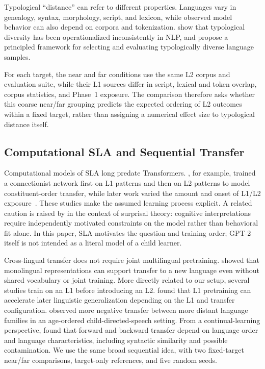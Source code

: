 \documentclass[11pt]{article}
\begin{document}
Typological ``distance'' can refer to different properties. Languages vary in genealogy, syntax, morphology, script, and lexicon, while observed model behavior can also depend on corpora and tokenization. \citet{ploeger-etal-2024-typological} show that typological diversity has been operationalized inconsistently in NLP, and \citet{ploeger-etal-2026-principled} propose a principled framework for selecting and evaluating typologically diverse language samples.

For each target, the near and far conditions use the same L2 corpus and evaluation suite, while their L1 sources differ in script, lexical and token overlap, corpus statistics, and Phase~1 exposure. The comparison therefore asks whether this coarse near/far grouping predicts the expected ordering of L2 outcomes within a fixed target, rather than assigning a numerical effect size to typological distance itself.

\subsection{Computational SLA and Sequential Transfer}

Computational models of SLA long predate Transformers. \citet{Gasser1990}, for example, trained a connectionist network first on L1 patterns and then on L2 patterns to model constituent-order transfer, while later work varied the amount and onset of L1/L2 exposure~\citep{MATUSEVYCH-ALISHAHI-BACKUS-2017}. These studies make the assumed learning process explicit. A related caution is raised by \citet{cotterell2026surprisal} in the context of surprisal theory: cognitive interpretations require independently motivated constraints on the model rather than behavioral fit alone. In this paper, SLA motivates the question and training order; GPT-2 itself is not intended as a literal model of a child learner.

Cross-lingual transfer does not require joint multilingual pretraining. \citet{artetxe-etal-2020-cross} showed that monolingual representations can support transfer to a new language even without shared vocabulary or joint training. More directly related to our setup, several studies train on an L1 before introducing an L2. \citet{oba-etal-2023-second} found that L1 pretraining can accelerate later linguistic generalization depending on the L1 and transfer configuration. \citet{yadavalli-etal-2023-slabert} observed more negative transfer between more distant language families in an age-ordered child-directed-speech setting. From a continual-learning perspective, \citet{gogoulou-etal-2024-continual-clean} found that forward and backward transfer depend on language order and language characteristics, including syntactic similarity and possible contamination. We use the same broad sequential idea, with two fixed-target near/far comparisons, target-only references, and five random seeds.
\end{document}

